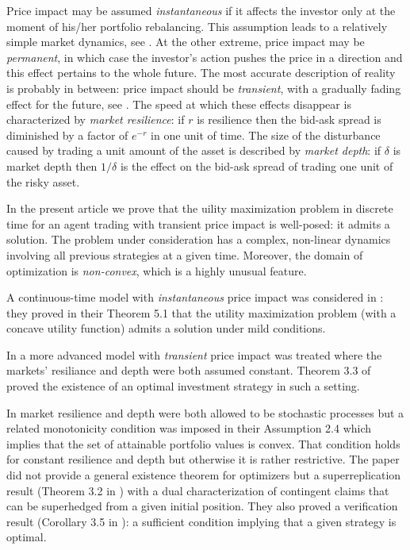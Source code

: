 \documentclass[a4paper]{article}
\begin{document}
Price impact may be assumed \emph{instantaneous} if it affects the investor only at the moment of his/her portfolio rebalancing. 
This assumption leads to a relatively simple market dynamics,
see \cite{gr,pym}. At the other extreme, price impact may be \emph{permanent}, in which case
the investor's action pushes the price in a direction and this effect pertains to the whole future.
The most accurate description of reality is probably in between: price impact should
be \emph{transient}, with a gradually fading effect for the future, see \cite{peter-yan,bank-voss}.
The speed at which these effects disappear is characterized by \emph{market resilience}: if $r$ is
resilience then the bid-ask spread is diminished by a factor of $e^{-r}$ in one unit of time. The
size of the disturbance
caused by trading a unit amount of the asset is described by \emph{market depth}: if
$\delta$ is market depth then $1/\delta$ is the effect on the bid-ask spread of trading one unit of the risky asset. 
  
In the present article we prove that the uility maximization problem in discrete time for an agent
trading with transient price impact is well-posed: it admits a solution.
The problem under consideration has a complex, non-linear dynamics involving
all previous strategies at a given time. Moreover, the domain of optimization 
is \emph{non-convex}, which is a highly unusual feature. 

A continuous-time model with \emph{instantaneous} price impact was considered in \cite{gr}: 
they proved in their Theorem 5.1 that the utility maximization problem (with a concave utility function) admits
a solution under mild conditions. 

In \cite{bank-voss} a more advanced model with \emph{transient} 
price impact was treated where the markets' resiliance and depth were both assumed constant.
Theorem 3.3 of \cite{bank-voss} proved the existence of an optimal investment strategy in such a setting.

In \cite{peter-yan} market resilience and depth were both allowed to be stochastic processes
but a related monotonicity condition was imposed in their Assumption 2.4 which implies
that the set of attainable portfolio values is convex. That condition holds for
constant resilience and depth but otherwise it is rather restrictive. The paper \cite{peter-yan} did not
provide a general existence theorem for optimizers but a superreplication result (Theorem 3.2 in \cite{peter-yan})
with a dual characterization of contingent claims that can be superhedged from a given initial
position. They also proved a verification result (Corollary 3.5 in \cite{peter-yan}): a sufficient condition
implying that a given strategy is optimal.
\end{document}
